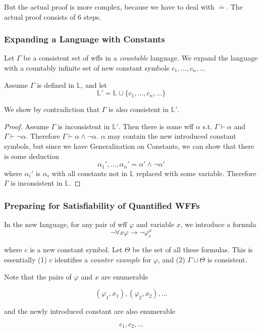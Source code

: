 But the actual proof is more complex, because we have to deal with $\doteq$. The actual proof consists of 6 steps.

\subsubsection{Expanding a Language with Constants}

Let $\Gamma$ be a consistent set of wffs in a \emph{countable} language. We expand the language with a countably infinite set of new constant symbols $c_1,\dots,c_n,\dots$

Assume $\Gamma$ is defined in $\mathbb{L}$, and let
\[ \mathbb{L}' = \mathbb{L}\cup\{ c_1,\dots,c_n,\dots \} \]

We show by contradiction that $\Gamma$ is also consistent in $\mathbb{L}'$.

\begin{proof}
    Assume $\Gamma$ is inconsistent in $\mathbb{L}'$. Then there is some wff $\alpha$ s.t. $\Gamma\vdash\alpha$ and $\Gamma\vdash\neg\alpha$. Therefore $\Gamma\vdash\alpha\wedge\neg\alpha$. $\alpha$ may contain the new introduced constant symbols, but since we have Generalization on Constants, we can show that there is some deduction
    \[ \alpha_1',\dots,\alpha_n' = \alpha'\wedge\neg\alpha' \]
    where $\alpha_i'$ is $\alpha_i$ with all constants not in $\mathbb{L}$ replaced with some variable. Therefore $\Gamma$ is inconsistent in $\mathbb{L}$.
\end{proof}

\subsubsection{Preparing for Satisfiability of Quantified WFFs}

In the new language, for any pair of wff $\varphi$ and variable $x$, we introduce a formula
\[ \neg\forall{x}\varphi \to \neg\varphi_c^x \]

where $c$ is a new constant symbol. Let $\Theta$ be the set of all these formulas. This is essentially (1) $c$ identifies a \emph{counter example} for $\varphi$, and (2) $\Gamma\cup\Theta$ is consistent.

Note that the pairs of $\varphi$ and $x$ are enumerable

\[ (\varphi_1,x_1), (\varphi_2,x_2),\dots \]

and the newly introduced constant are also enumerable

\[ c_1,c_2,\dots \]

